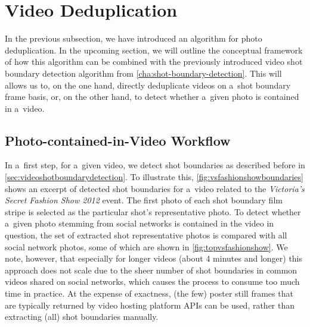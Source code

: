 \section{Video Deduplication}

In the previous subsection, we have introduced
an algorithm for photo deduplication.
In the upcoming section, we will outline the conceptual framework
of how this algorithm can be combined with the previously introduced
video shot boundary detection algorithm from \autoref{cha:shot-boundary-detection}.
This will allows us to, on the one hand,
directly deduplicate videos on a~shot boundary frame basis,
or, on the other hand, to detect
whether a~given photo is contained in a~video.

\subsection{Photo-contained-in-Video Workflow}

In a~first step, for a~given video, we detect shot boundaries
as described before in \autoref{sec:videoshotboundarydetection}.
To illustrate this,
\autoref{fig:vsfashionshowboundaries} shows an excerpt
of detected shot boundaries for a~video related to
the \emph{Victoria's Secret Fashion Show 2012} event.
The first photo of each shot boundary film stripe
is selected as the particular shot's representative photo.
To detect whether a~given photo stemming from social networks
is contained in the video in question,
the set of extracted shot representative photos is compared
with all social network photos,
some of which are shown in \autoref{fig:topvsfashionshow}.
We note, however, that especially for longer videos
(about 4 minutes and longer)
this approach does not scale due to the sheer number of shot boundaries
in common videos shared on social networks,
which causes the process to consume too much time in practice.
At the expense of exactness, (the few) poster still frames
that are typically returned by video hosting platform APIs
can be used, rather than extracting (all) shot boundaries manually.

